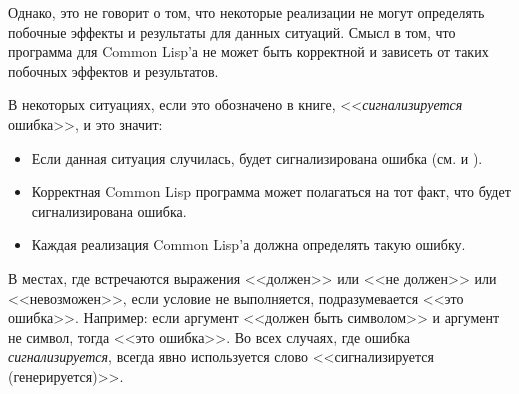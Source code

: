 Однако, это не говорит о том, что некоторые реализации не могут определять
побочные эффекты и результаты для данных ситуаций. Смысл в том, что программа для
Common Lisp'а не может быть корректной и зависеть от таких побочных эффектов и
результатов.

В некоторых ситуациях, если это обозначено в книге,
<<\emph{сигнализируется} ошибка>>, и это значит: 
\begin{itemize}
\item Если данная ситуация случилась, будет сигнализирована ошибка
(см.  и ).

\item Корректная Common Lisp программа может полагаться на тот факт, что будет
сигнализирована ошибка.

\item Каждая реализация Common Lisp'а должна определять такую ошибку.
\end{itemize}

В местах, где встречаются выражения <<должен>> или <<не должен>> или
<<невозможен>>, если условие не
выполняется, подразумевается <<это ошибка>>. Например: если аргумент <<должен
быть символом>> и аргумент не символ, тогда <<это
ошибка>>. Во всех случаях, где ошибка \emph{сигнализируется}, всегда явно
используется слово <<сигнализируется (генерируется)>>.

